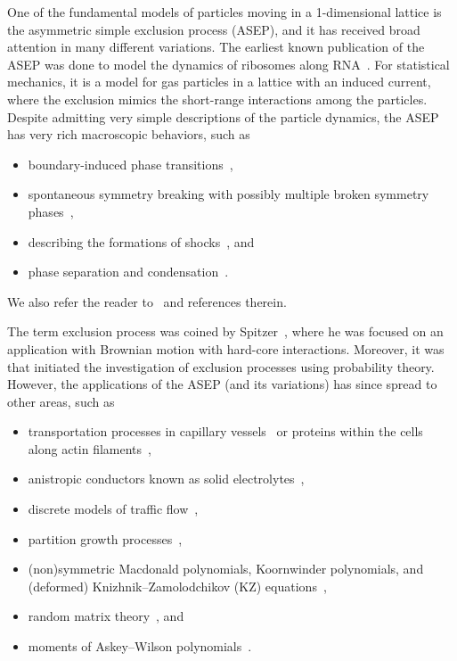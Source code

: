 \documentclass[reqno]{amsart}
\newcommand{\0}{\phantom{c}}
\theoremstyle{plain}
\theoremstyle{definition}
\numberwithin{equation}{section}
\begin{document}
One of the fundamental models of particles moving in a 1-dimensional lattice is the asymmetric simple exclusion process (ASEP), and it has received broad attention in many different variations.
The earliest known publication of the ASEP was done to model the dynamics of ribosomes along RNA~\cite{MGP68}.
For statistical mechanics, it is a model for gas particles in a lattice with an induced current, where the exclusion mimics the short-range interactions among the particles.
Despite admitting very simple descriptions of the particle dynamics, the ASEP has very rich macroscopic behaviors, such as
\begin{itemize}
\item boundary-induced phase transitions~\cite{Krug91},
\item spontaneous symmetry breaking with possibly multiple broken symmetry phases~\cite{AHR98,AHR99,CEM01,EFGM95,EPSZ05,GLEMSS95,PK07},
\item describing the formations of shocks~\cite{DJLS93,Ferrari92,FF94,FF94II,Liggett76}, and
\item phase separation and condensation~\cite{EKKM98,JNHWW09,KLMST02,RSS00}.
\end{itemize}
We also refer the reader to~\cite{PEM09,Schutz01,SZ95,TJHJ16} and references therein.

The term exclusion process was coined by Spitzer~\cite{Spitzer70}, where he was focused on an application with Brownian motion with hard-core interactions.
Moreover, it was~\cite{Spitzer70} that initiated the investigation of exclusion processes using probability theory.
However, the applications of the ASEP (and its variations) has since spread to other areas, such as
\begin{itemize}
\item transportation processes in capillary vessels~\cite{Levitt73} or proteins within the cells along actin filaments~\cite{KNL05},
\item anistropic conductors known as solid electrolytes~\cite{CL99},
\item discrete models of traffic flow~\cite{Schad01},
\item partition growth processes~\cite{Lam15},
\item (non)symmetric Macdonald polynomials, Koornwinder polynomials, and (deformed) Knizhnik--Zamolodchikov (KZ) equations~\cite{CdGW15,KT07},
\item random matrix theory~\cite{Johansson00,TW09}, and
\item moments of Askey--Wilson polynomials~\cite{CW11,USW04}.
\end{itemize}
\end{document}
